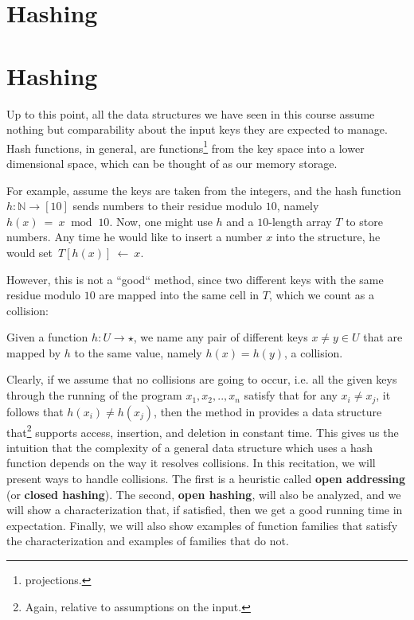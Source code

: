 

\newcommand{\image}{\text{ Im } }



\ifdefined\BOOK
\chapter{Hashing}
\else
\setcounter{chapter}{8}
\chapter*{Hashing}
\thispagestyle{firststyle}
\fi

Up to this point, all the data structures we have seen in this course assume nothing but comparability about the input keys they are expected to manage. Hash functions, in general, are functions\footnote{projections.} from the key space into a lower dimensional space, which can be thought of as our memory storage. 
\begin{example}
  \label{example:bad}
For example, assume the keys are taken from the integers, and the hash function $h : \mathbb{N} \rightarrow [10]$ sends numbers to their residue modulo $10$, namely $h(x)~=~x~\text{ mod }~10$. Now, one might use $h$ and a $10$-length array $T$ to store numbers. Any time he would like to insert a number $x$ into the structure, he would set~$T[h(x)]~\leftarrow~x$. 
\end{example}
However, this is not a ``good`` method, since two different keys with the same residue modulo $10$ are mapped into the same cell in $T$, which we count as a collision:  
\begin{definition}[collision.]
  Given a function $h : U \rightarrow \star$, we name any pair of different keys $x\neq y \in U$ that are mapped by $h$ to the same value, namely $h(x) = h(y)$, a collision.
\end{definition}
Clearly, if we assume that no collisions are going to occur, i.e. all the given keys through the running of the program $x_{1},x_{2},..,x_{n}$ satisfy that for any $x_{i}\neq x_j$, it follows that $h(x_{i}) \neq h(x_{j})$, then the method in  provides a data structure that\footnote{Again, relative to assumptions on the input.} supports access, insertion, and deletion in constant time. This gives us the intuition that the complexity of a general data structure which uses a hash function depends on the way it resolves collisions. In this recitation, we will present ways to handle collisions. The first is a heuristic called \textbf{open addressing} (or \textbf{closed hashing}). The second, \textbf{open hashing}, will also be analyzed, and we will show a characterization that, if satisfied, then we get a good running time in expectation. Finally, we will also show examples of function families that satisfy the characterization and examples of families that do not.



